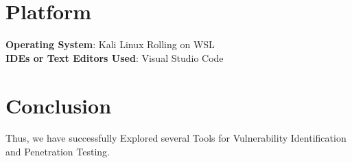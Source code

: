 \documentclass[11pt]{article}
\begin{document}
\section{Platform}
\textbf{Operating System}: Kali Linux Rolling on WSL\\
\textbf{IDEs or Text Editors Used}: Visual Studio Code\\

\section{Conclusion}
Thus, we have successfully Explored several Tools for Vulnerability Identification and Penetration Testing.

\clearpage

\pagebreak
\end{document}
